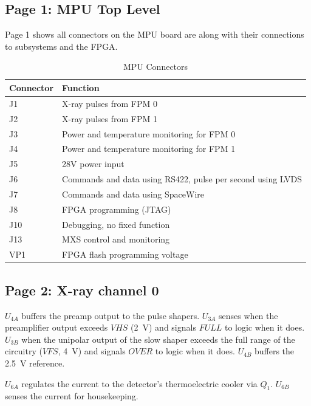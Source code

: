 \documentclass[11pt]{article}
\begin{document}
\subsection{Page 1: MPU Top Level}
\label{TopLevel}

Page 1 shows all connectors on the MPU board are along with their connections to subsystems and the FPGA.

\begin{table}[htp]
\caption{MPU Connectors}
\begin{center}
\begin{tabular}{|l|l|}
\hline
Connector & Function \\
\hline
\hline
J1 & X-ray pulses from FPM 0 \\
J2 & X-ray pulses from FPM 1 \\
J3 & Power and temperature monitoring for FPM 0 \\
J4 & Power and temperature monitoring for FPM 1 \\
J5 & 28V power input \\
J6 & Commands and data using RS422, pulse per second using LVDS \\
J7 & Commands and data using SpaceWire \\
J8 & FPGA programming (JTAG) \\
J10 & Debugging, no fixed function \\
J13 & MXS control and monitoring \\
VP1 & FPGA flash programming voltage \\
\hline
\end{tabular}
\end{center}
\label{connectors}
\end{table}

\subsection{Page 2: X-ray channel 0}
\label{Channel0}

$U_{4A}$ buffers the preamp output to the pulse shapers. $U_{3A}$ senses when the preamplifier output exceeds $VHS$ (2\ V) and signals $FULL$ to logic when it does. $U_{3B}$ when the unipolar output of the slow shaper exceeds the full range of the circuitry ($VFS$, 4\ V) and signals $OVER$ to logic when it does. $U_{4B}$ buffers the 2.5\ V reference.

$U_{6A}$ regulates the current to the detector's thermoelectric cooler via $Q_1$. $U_{6B}$ senses the current for housekeeping.
\end{document}
